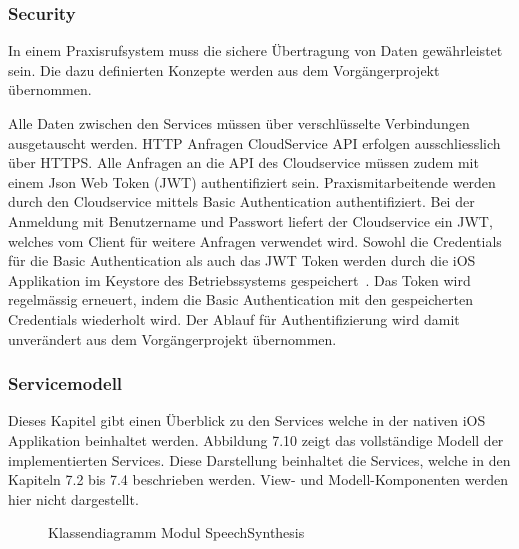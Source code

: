 \subsubsection{Security}

In einem Praxisrufsystem muss die sichere Übertragung von Daten gewährleistet sein.
Die dazu definierten Konzepte werden aus dem Vorgängerprojekt übernommen.

Alle Daten zwischen den Services müssen über verschlüsselte Verbindungen ausgetauscht werden.
HTTP Anfragen CloudService API erfolgen ausschliesslich über HTTPS\@.
Alle Anfragen an die API des Cloudservice müssen zudem mit einem Json Web Token (JWT) authentifiziert sein.
Praxismitarbeitende werden durch den Cloudservice mittels Basic Authentication authentifiziert.
Bei der Anmeldung mit Benutzername und Passwort liefert der Cloudservice ein JWT, welches vom Client für weitere Anfragen verwendet wird.
Sowohl die Credentials für die Basic Authentication als auch das JWT Token werden durch die iOS Applikation im Keystore des Betriebssystems gespeichert~\cite{ip5}.
Das Token wird regelmässig erneuert, indem die Basic Authentication mit den gespeicherten Credentials wiederholt wird.
Der Ablauf für Authentifizierung wird damit unverändert aus dem Vorgängerprojekt übernommen.

\subsubsection{Servicemodell}

Dieses Kapitel gibt einen Überblick zu den Services welche in der nativen iOS Applikation beinhaltet werden.
Abbildung 7.10 zeigt das vollständige Modell der implementierten Services.
Diese Darstellung beinhaltet die Services, welche in den Kapiteln 7.2 bis 7.4 beschrieben werden.
View- und Modell-Komponenten werden hier nicht dargestellt.

\begin{figure}[h]
    \centering
    \begin{minipage}[b]{1\textwidth}
        \caption{Klassendiagramm Modul SpeechSynthesis}
    \end{minipage}
\end{figure}

\clearpage
